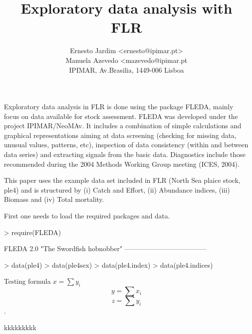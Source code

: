 \documentclass[a4paper]{article}
\begin{document}
\title{Exploratory data analysis with FLR}
\author{Ernesto Jardim <ernesto@ipimar.pt>\\
Manuela Azevedo <mazevedo@ipimar.pt\\
IPIMAR, Av.Brasilia, 1449-006 Lisboa}
\date{}
\maketitle
Exploratory data analysis in FLR is done using the package FLEDA, mainly focus on data available for stock assessment. FLEDA was developed under the project IPIMAR/NeoMAv. It includes a combination of simple calculations and graphical representations aiming at data screening (checking for missing data, unusual values, patterns, etc), inspection of data consistency (within and between data series) and extracting signals from the basic data. Diagnostics include those recommended during the 2004 Methods Working Group meeting (ICES, 2004).

This paper uses the example data set included in FLR (North Sea plaice stock, ple4) and is structured by (i) Catch and Effort, (ii) Abundance indices, (iii) Biomass and (iv) Total mortality.

First one needs to load the required packages and data.

\begin{center}
\begin{minipage}[H]{0.95\textwidth}%
\begin{shaded}%
\begin{Schunk}
\begin{Sinput}
> require(FLEDA)
\end{Sinput}
\begin{Soutput}
FLEDA 2.0 "The Swordfish hobnobber"
------------------------------------
\end{Soutput}
\begin{Sinput}
> data(ple4)
> data(ple4sex)
> data(ple4.index)
> data(ple4.indices)
\end{Sinput}
\end{Schunk}
\end{shaded}%
\end{minipage}
\end{center}

Testing formula $x=\sum{y_i}$ \[ y=\sum{x_i} \] \begin{equation}
	z=\sum{y_i}
\end{equation}.

kkkkkkkkk
\end{document}
